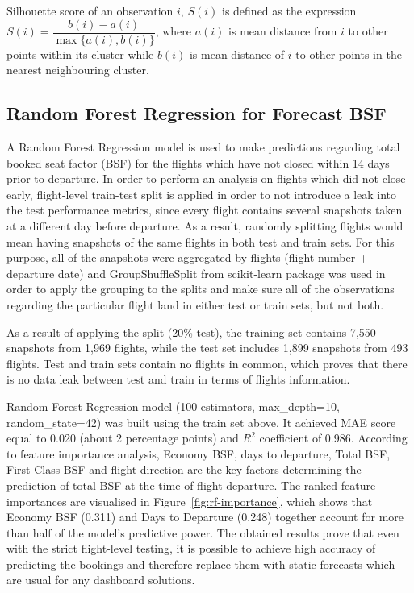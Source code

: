 Silhouette score of an observation $i$, $S(i)$ is defined as the expression $S(i) = \dfrac{b(i) - a(i)}{\max\{a(i), b(i)\}}$, where $a(i)$ is mean distance from $i$ to other points within its cluster while $b(i)$ is mean distance of $i$ to other points in the nearest neighbouring cluster.

\subsection{Random Forest Regression for Forecast BSF}

A Random Forest Regression model is used to make predictions regarding total booked seat factor (BSF) for the flights which have not closed within 14 days prior to departure. In order to perform an analysis on flights which did not close early, flight-level train-test split is applied in order to not introduce a leak into the test performance metrics, since every flight contains several snapshots taken at a different day before departure. As a result, randomly splitting flights would mean having snapshots of the same flights in both test and train sets. For this purpose, all of the snapshots were aggregated by flights (flight number + departure date) and GroupShuffleSplit from scikit-learn package was used in order to apply the grouping to the splits and make sure all of the observations regarding the particular flight land in either test or train sets, but not both.

As a result of applying the split (20\% test), the training set contains 7,550 snapshots from 1,969 flights, while the test set includes 1,899 snapshots from 493 flights. Test and train sets contain no flights in common, which proves that there is no data leak between test and train in terms of flights information.

Random Forest Regression model (100 estimators, max\_depth=10, random\_state=42) was built using the train set above. It achieved MAE score equal to 0.020 (about 2 percentage points) and $R^2$ coefficient of 0.986. According to feature importance analysis, Economy BSF, days to departure, Total BSF, First Class BSF and flight direction are the key factors determining the prediction of total BSF at the time of flight departure. The ranked feature importances are visualised in Figure~\ref{fig:rf-importance}, which shows that Economy BSF (0.311) and Days to Departure (0.248) together account for more than half of the model's predictive power. The obtained results prove that even with the strict flight-level testing, it is possible to achieve high accuracy of predicting the bookings and therefore replace them with static forecasts which are usual for any dashboard solutions.


